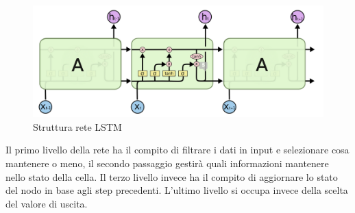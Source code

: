 \documentclass[%
    corpo=12pt,
    twoside,
    oldstyle,
    autoretitolo,
    greek,
    evenboxes,
]{toptesi}
\begin{document}
\begin{figure}[!ht]
  \includegraphics[width=\linewidth]{figure/lstm.png}
  \caption{Struttura rete LSTM \cite{lstm_image}}
  \label{fig:lstm}
\end{figure}

Il primo livello della rete ha il compito di filtrare i dati in input e selezionare cosa mantenere o meno, il secondo passaggio gestirà quali informazioni mantenere nello stato della cella. Il terzo livello invece ha il compito di aggiornare lo stato del nodo in base agli step precedenti. L’ultimo livello si occupa invece della scelta del valore di uscita.
\end{document}
